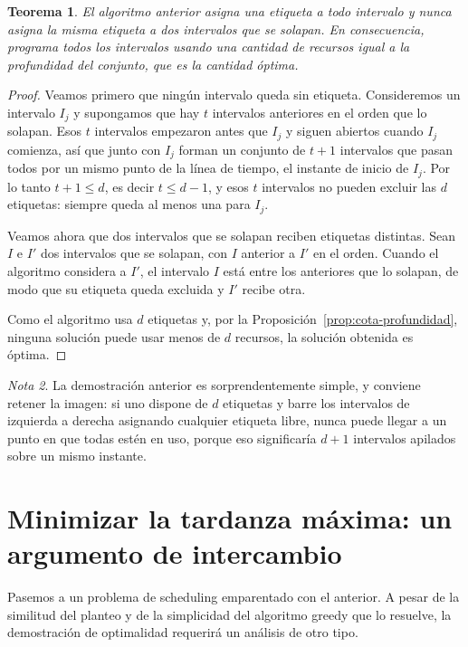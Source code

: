 \documentclass[12pt, spanish, oneside, openany]{book}
\theoremstyle{uprightplain}
\newtheorem{teorema}{Teorema}[section]
\theoremstyle{definition}
\theoremstyle{remark}
\newtheorem{nota}[teorema]{Nota}
\theoremstyle{definition}
\begin{document}
\begin{teorema}
\label{teo:particion}
El algoritmo anterior asigna una etiqueta a todo intervalo y nunca asigna la misma etiqueta a dos intervalos que se solapan. En consecuencia, programa todos los intervalos usando una cantidad de recursos igual a la profundidad del conjunto, que es la cantidad óptima.
\end{teorema}
\begin{proof}
Veamos primero que ningún intervalo queda sin etiqueta. Consideremos un intervalo $I_j$ y supongamos que hay $t$ intervalos anteriores en el orden que lo solapan. Esos $t$ intervalos empezaron antes que $I_j$ y siguen abiertos cuando $I_j$ comienza, así que junto con $I_j$ forman un conjunto de $t+1$ intervalos que pasan todos por un mismo punto de la línea de tiempo, el instante de inicio de $I_j$. Por lo tanto $t+1 \le d$, es decir $t \le d-1$, y esos $t$ intervalos no pueden excluir las $d$ etiquetas: siempre queda al menos una para $I_j$.

Veamos ahora que dos intervalos que se solapan reciben etiquetas distintas. Sean $I$ e $I'$ dos intervalos que se solapan, con $I$ anterior a $I'$ en el orden. Cuando el algoritmo considera a $I'$, el intervalo $I$ está entre los anteriores que lo solapan, de modo que su etiqueta queda excluida y $I'$ recibe otra.

Como el algoritmo usa $d$ etiquetas y, por la Proposición~\ref{prop:cota-profundidad}, ninguna solución puede usar menos de $d$ recursos, la solución obtenida es óptima.
\end{proof}

\begin{nota}
La demostración anterior es sorprendentemente simple, y conviene retener la imagen: si uno dispone de $d$ etiquetas y barre los intervalos de izquierda a derecha asignando cualquier etiqueta libre, nunca puede llegar a un punto en que todas estén en uso, porque eso significaría $d+1$ intervalos apilados sobre un mismo instante.
\end{nota}

\section{Minimizar la tardanza máxima: un argumento de intercambio}
\label{sec:retraso}

Pasemos a un problema de scheduling emparentado con el anterior. A pesar de la similitud del planteo y de la simplicidad del algoritmo greedy que lo resuelve, la demostración de optimalidad requerirá un análisis de otro tipo.
\end{document}
